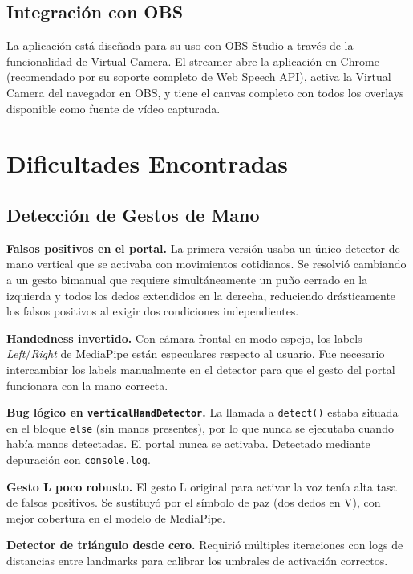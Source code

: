 \documentclass[11pt]{article}
\begin{document}
\subsection{Integración con OBS}

La aplicación está diseñada para su uso con OBS Studio a través de la funcionalidad de Virtual Camera. El streamer abre la aplicación en Chrome (recomendado por su soporte completo de Web Speech API), activa la Virtual Camera del navegador en OBS, y tiene el canvas completo con todos los overlays disponible como fuente de vídeo capturada.

\section{Dificultades Encontradas}

\subsection{Detección de Gestos de Mano}

\textbf{Falsos positivos en el portal.} La primera versión usaba un único detector de mano vertical que se activaba con movimientos cotidianos. Se resolvió cambiando a un gesto bimanual que requiere simultáneamente un puño cerrado en la izquierda y todos los dedos extendidos en la derecha, reduciendo drásticamente los falsos positivos al exigir dos condiciones independientes.

\textbf{Handedness invertido.} Con cámara frontal en modo espejo, los labels \textit{Left}/\textit{Right} de MediaPipe están especulares respecto al usuario. Fue necesario intercambiar los labels manualmente en el detector para que el gesto del portal funcionara con la mano correcta.

\textbf{Bug lógico en \texttt{verticalHandDetector}.} La llamada a \texttt{detect()} estaba situada en el bloque \texttt{else} (sin manos presentes), por lo que nunca se ejecutaba cuando había manos detectadas. El portal nunca se activaba. Detectado mediante depuración con \texttt{console.log}.

\textbf{Gesto L poco robusto.} El gesto L original para activar la voz tenía alta tasa de falsos positivos. Se sustituyó por el símbolo de paz (dos dedos en V), con mejor cobertura en el modelo de MediaPipe.

\textbf{Detector de triángulo desde cero.} Requirió múltiples iteraciones con logs de distancias entre landmarks para calibrar los umbrales de activación correctos.
\end{document}
